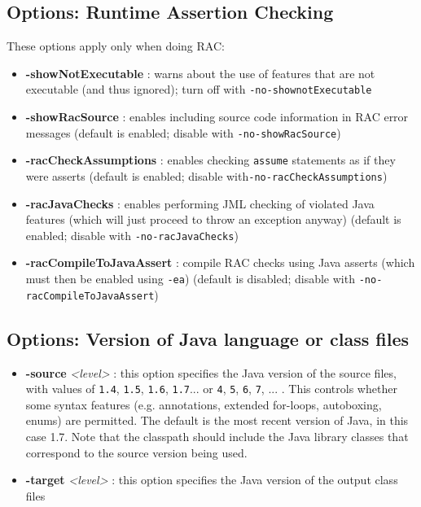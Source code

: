 \subsection{Options: Runtime Assertion Checking}
\label{OptionsRAC}

These options apply only when doing RAC:
\begin{itemize}
\item \textbf{-showNotExecutable} : warns about the use of features that are not executable (and thus ignored); turn off with \texttt{-no-shownotExecutable}
\item \textbf{-showRacSource} : enables including source code information in RAC error messages (default is enabled; disable with \texttt{-no-showRacSource})
\item \textbf{-racCheckAssumptions} : enables checking \texttt{assume} statements as if they were asserts (default is enabled; disable with\texttt{-no-racCheckAssumptions})
\item \textbf{-racJavaChecks} : enables performing JML checking of violated Java features (which will just proceed to throw an exception anyway) (default is enabled; disable with \texttt{-no-racJavaChecks})
\item \textbf{-racCompileToJavaAssert} : compile RAC checks using Java asserts (which must then be enabled using \texttt{-ea}) (default is disabled; disable with \texttt{-no-racCompileToJavaAssert})
\end{itemize}

\subsection{Options: Version of Java language or class files}

\begin{itemize}
\item \textbf{-source} {\it <level>} : this option specifies the Java version of the source files, with values of {\tt 1.4}, {\tt 1.5}, {\tt 1.6}, {\tt 1.7}... or {\tt 4}, {\tt 5}, {\tt 6}, {\tt 7}, ... . This controls whether some syntax features  
(e.g. annotations, extended for-loops, autoboxing, enums) are permitted. The default is the most recent version
of Java, in this case 1.7.  Note that the classpath should include the Java library classes that
correspond to the source version being used.

\item \textbf{-target} {\it <level>} : this option specifies the Java version of the output class files
\end{itemize}


